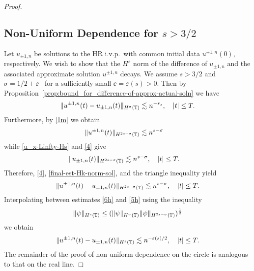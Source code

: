 \begin{proof}
\subsection{Non-Uniform Dependence for $s > 3/2$}
%
%
%
Let $u_{\pm 1, n}$ be solutions to the HR i.v.p.\ with common initial data 
$u^{\pm 1,
n}(0)$, respectively.
We wish to show that the $H^s$ norm of the difference of $u_{\pm 1,
n}$ and the associated approximate solution $u^{\pm 1, n}$ decays.
We assume
$s > 3/2 $ and $\sigma = 1/2 + \ee$ \ for a sufficiently small
$\ee= \ee(s) > 0$. 
Then by Proposition~\ref{prop:bound_for_difference-of-approx-actual-soln} we 
have
%
%
\begin{equation}
\begin{split}
\|u^{\pm 1, n}(t) - u_{\pm 1, n} (t) \|_{H^\sigma (\mathbb{T})} \lesssim n^{-r_s}
\label{6h}, \quad |t| \le T.
\end{split}
\end{equation}
%
%
Furthermore, by \eqref{1m} we obtain
%
%
\begin{equation}
\begin{split}
\|u^{\pm 1, n} (t) \|_{H^{2s - \sigma} (\mathbb{T})}
& \lesssim n^{s-\sigma}
\label{4}
\end{split}
\end{equation}
%
%
while \eqref{u_x-Linfty-Hs} and \eqref{4} give
\begin{equation}
\begin{split}
\|u_{\pm 1, n} (t) \|_{H^{2s - \sigma}(\mathbb{T})}
& \lesssim n^{s- \sigma}, \quad |t| \le T.
\label{final-est-Hk-norm-sol}
\end{split}
\end{equation}
%
%
%
%
%
%
%
Therefore, \eqref{4}, \eqref{final-est-Hk-norm-sol}, and the triangle
inequality yield
%
%
\begin{equation}
\begin{split}
\|u^{\pm 1, n} (t) - u_{\pm 1, n}(t)\|_{H^{2s - \sigma}(\mathbb{T})}
\lesssim n^{s-\sigma}, \quad |t| \le T.
\label{5h}
\end{split}
\end{equation}
%
%
%
%
Interpolating between estimates \eqref{6h} and \eqref{5h} using the 
inequality
%
\begin{equation*}
\|\psi \|_{H^s (\mathbb{T})} \leq  (\| \psi \|_{H^\sigma (\mathbb{T})} \| \psi
\|_{H^{2s-\sigma}(\mathbb{T})})^\frac12
\end{equation*}
%
%
we obtain
%
%
\begin{equation}
\begin{split}
\|u^{\pm 1,n}(t) - u_{\pm 1, n}(t) \|_{H^s (\mathbb{T})} \lesssim
n^{-\varepsilon(s)/2}, \quad |t| \le T.
\label{10h}
\end{split}
\end{equation}
%
%
The remainder of the proof of non-uniform dependence on the circle is
analogous to that on the real line. 
\end{proof}
%
%
%
%
%
